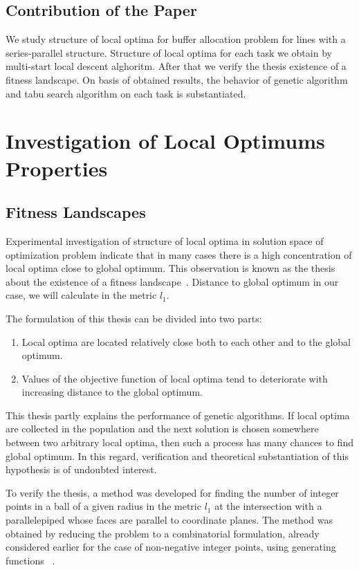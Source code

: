 \documentclass{ifacconf}
\begin{document}
\subsection{Contribution of the Paper}
We study structure of local optima for buffer allocation problem for lines with a series-parallel structure. 
Structure of local optima for each task we obtain by multi-start local descent alghoritm. After that we verify the thesis existence of a fitness landscape. On basis of obtained results, the behavior of genetic algorithm and tabu search algorithm on each task is substantiated.

\section{Investigation of Local Optimums Properties} \label{investigation}

\subsection{Fitness Landscapes}\label{subsec:landscapes}
Experimental investigation of structure of local optima in solution space of optimization problem
indicate that in many cases there is a high
concentration of local optima close to global optimum. 
This observation is known as
the thesis about the existence of a fitness landscape~\cite{Boese,Hains}. Distance to global optimum
in our case, we will calculate in the metric $l_1$.

\noindent The formulation of this thesis can be divided into two parts:
\begin{enumerate}
\item Local optima are located relatively close both to each other and to the global optimum.\newline
\item Values of the objective function of local optima tend to deteriorate with increasing distance to the global optimum.
\end{enumerate}

This thesis partly explains the performance of genetic
algorithms. If local optima are collected in the population and
the next solution is chosen somewhere between two arbitrary
local optima, then such a process has many chances to find
global optimum. In this regard, verification and theoretical
substantiation of this hypothesis is of undoubted interest.

To verify the thesis, a method was developed
for finding the number of integer points in
a ball of a given radius in the metric $l_1$ at the intersection with a parallelepiped
whose faces are parallel to coordinate planes.
The method
was obtained by reducing the problem to a combinatorial
formulation, already considered earlier for the case of non-negative
integer points, using
generating functions ~\cite{Sach}.
\end{document}
